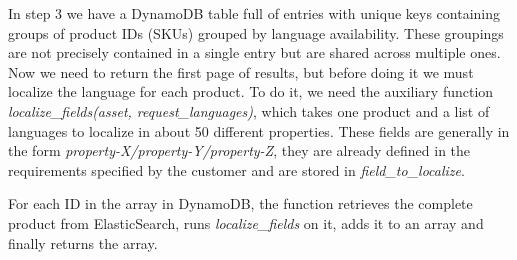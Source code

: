 In step 3 we have a DynamoDB table full of entries with unique keys containing
groups of product IDs (SKUs) grouped by language availability. These groupings are not precisely
contained in a single entry but are shared across multiple ones.
Now we need to return the first page of results, but before doing it 
we must localize the language for each product.
To do it, we need the auxiliary function
\textit{localize\_fields(asset, request\_languages)}, which takes one product and
a list of languages to localize in about 50 different properties.
These fields are generally in the form \textit{property-X/property-Y/property-Z}, they are already defined
in the requirements specified by the customer and are stored in \textit{field\_to\_localize}.

For each ID in the array in DynamoDB, the function retrieves the complete product from ElasticSearch,
runs \textit{localize\_fields} on it, adds it to an array and finally returns the array.
